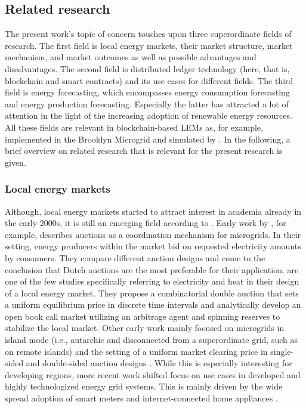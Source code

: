 
\subsection{Related research}\label{Sec:Intro;Subsec:Related}
The present work's topic of concern touches upon three superordinate fields of research. The first field is local energy markets, their market structure, market mechanism, and market outcomes as well as possible advantages and disadvantages. The second field is distributed ledger technology (here, that is, blockchain and smart contracts) and its use cases for different fields. The third field is energy forecasting, which encompasses energy consumption forecasting and energy production forecasting. Especially the latter has attracted a lot of attention in the light of the increasing adoption of renewable energy resources. All these fields are relevant in blockchain-based LEMs as, for example, implemented in the Brooklyn Microgrid and simulated by \citet{Mengelkamp:2018a}. In the following, a brief overview on related research that is relevant for the present research is given.



\subsubsection{Local energy markets}

Although, local energy markets started to attract interest in academia already in the early 2000s, it is still an emerging field according to \citet{Stadler:2016}. Early work by \citet{Alibhai:2004}, for example, describes auctions as a coordination mechanism for microgrids. In their setting, energy producers within the market bid on requested electricity amounts by consumers. They compare different auction designs and come to the conclusion that Dutch auctions are the most preferable for their application. \citet{Block:2008} are one of the few studies specifically referring to electricity and heat in their design of a local energy market. They propose a combinatorial double auction that sets a uniform equilibrium price in discrete time intervals and analytically develop an open book call market utilizing an arbitrage agent and spinning reserves to stabilize the local market. Other early work mainly focused on microgrids in island mode (i.e., autarchic and disconnected from a superordinate grid, such as on remote islands) and the setting of a uniform market clearing price in single-sided and double-sided auction designs \citep{Sinha:2008}. While this is especially interesting for developing regions, more recent work shifted focus on use cases in developed and highly technologized energy grid systems. This is mainly driven by the wide spread adoption of smart meters and internet-connected home appliances \citep{Burger:2016}.

